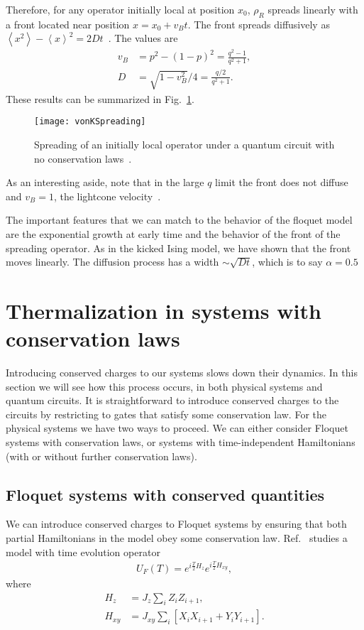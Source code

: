 \documentclass[a4paper,12pt]{article}
\newcommand{\ex}[1]{\left\langle #1 \right\rangle}
\newcommand{\nn}{\nonumber\\}
\newcommand{\note}[1]{{\color{red}{#1}}}
\begin{document}
Therefore, for any operator initially local at position $x_0$, $\rho_R$ spreads linearly with a front located near position $x = x_0 + v_B t$. The front spreads diffusively as $\ex{x^2}-\ex{x}^2=2Dt$~\cite{vonKeyserlingkHydro}. The values are
\begin{align}
v_B &= p^2-(1-p)^2 = \frac{q^2-1}{q^2+1},\nn
D   &= \sqrt{1-v_B^2}/4 = \frac{q/2}{q^2+1}.
\end{align}
These results can be summarized in Fig.~\ref{fig:vonKSpreading}.
\begin{figure}
	\centering
	\texttt{[image: vonKSpreading]}
	\caption{Spreading of an initially local operator under a quantum circuit with no conservation laws~\cite{vonKeyserlingkHydro}.}
	\label{fig:vonKSpreading}
\end{figure}
As an interesting aside, note that in the large $q$ limit the front does not diffuse and $v_B=1$, the lightcone velocity~\cite{NahumOpSp}.

The important features that we can match to the behavior of the floquet model are the exponential growth at early time and the behavior of the front of the spreading operator. As in the kicked Ising model, we have shown that the front moves linearly. The diffusion process has a width $\sim \sqrt{Dt}$, which is to say $\alpha=0.5$

\note{vonKeyserlingk page 6.}


\section{Thermalization in systems with conservation laws} \label{sec:cons}

Introducing conserved charges to our systems slows down their dynamics. In this section we will see how this process occurs, in both physical systems and quantum circuits. It is straightforward to introduce conserved charges to the circuits by restricting to gates that satisfy some conservation law. For the physical systems we have two ways to proceed. We can either consider Floquet systems with conservation laws, or systems with time-independent Hamiltonians (with or without further conservation laws).

\subsection{Floquet systems with conserved quantities} \label{sub:fcons}

We can introduce conserved charges to Floquet systems by ensuring that both partial Hamiltonians in the model obey some conservation law. Ref.~\cite{KhemaniOpSp} studies a model with time evolution operator
\begin{align}
U_F(T)=e^{i\frac{T}{2}H_z}e^{i\frac{T}{2}H_{xy}},
\end{align}
where
\begin{align}
H_z &= J_z\sum_i Z_iZ_{i+1},\nn
H_{xy} &= J_{xy}\sum_i\left[X_iX_{i+1}+Y_iY_{i+1}\right].
\end{align}
\end{document}
